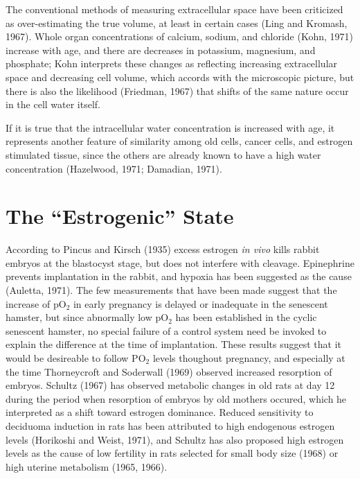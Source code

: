 The conventional methods of measuring extracellular space have been criticized as over-estimating the true volume, at least in certain cases (Ling and Kromash, 1967). Whole organ concentrations of
calcium, sodium, and chloride (Kohn, 1971) increase with age, and there are decreases in potassium, magnesium, and phosphate; Kohn interprets these changes as reflecting
increasing extracellular space and decreasing cell volume, which accords with the microscopic picture, but there is also the likelihood (Friedman, 1967) that shifts of the same nature occur in the cell water itself.

If it is true that the intracellular water concentration is increased with age, it represents another feature of similarity among old cells, cancer cells, and estrogen
stimulated tissue, since the others are already known to have a high water concentration (Hazelwood, 1971; Damadian, 1971).

\section{The ``Estrogenic'' State}

According to Pincus and Kirsch (1935) excess estrogen \textit{in vivo} kills rabbit embryos at the blastocyst stage, but does not interfere with cleavage. Epinephrine prevents implantation in the rabbit, and hypoxia
has been suggested as the cause (Auletta, 1971). The few measurements that have been made suggest that the increase of pO$_{2}$ in early pregnancy is delayed or inadequate in the senescent hamster, but since abnormally low pO$_{2}$ has been established
in the cyclic senescent hamster, no special failure of a control system need be invoked to explain the difference at the time of implantation. These results suggest that it would be desireable to follow PO$_{2}$ levels thoughout pregnancy, and especially
at the time Thorneycroft and Soderwall (1969) observed increased resorption of embryos. Schultz (1967) has observed metabolic changes in old rats at day 12 during the period when resorption of embryos by old mothers occured, which he interpreted as a shift
toward estrogen dominance. Reduced sensitivity to deciduoma induction in rats has been attributed to high endogenous estrogen levels (Horikoshi and Weist, 1971), and Schultz has also proposed high estrogen levels as the cause of low fertility in rats selected
for small body size (1968) or high uterine metabolism (1965, 1966).

